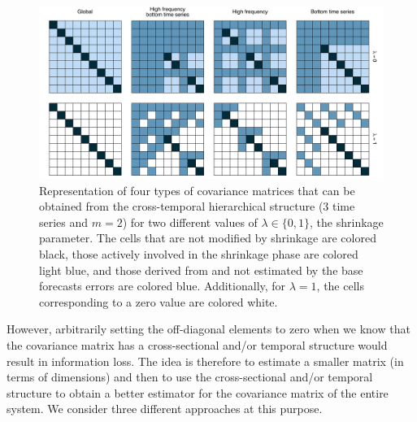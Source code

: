 \documentclass[a4paper,11pt]{article}
\theoremstyle{definition}
\begin{document}
\begin{figure}[!h]
	\centering
	\includegraphics[width = \linewidth]{fig/shr_cov/shr_color.pdf}
	\caption{Representation of four types of covariance matrices that can be obtained from the cross-temporal hierarchical structure ($3$ time series and $m = 2$) for two different values of $\lambda\in\{0,1\}$, the shrinkage parameter. The cells that are not modified by shrinkage are colored black, those actively involved in the shrinkage phase are colored light blue, and those derived from and not estimated by the base forecasts errors are colored blue. Additionally, for $\lambda = 1$, the cells corresponding to a zero value are colored white.}
	\label{fig:shr_grid}
\end{figure}

However, arbitrarily setting the off-diagonal elements to zero when we know that the covariance matrix has a cross-sectional and/or temporal structure would result in information loss. The idea is therefore to estimate a smaller matrix (in terms of dimensions) and then to use the cross-sectional and/or temporal structure to obtain a better estimator for the covariance matrix of the entire system. We consider three different approaches at this purpose.
\end{document}
